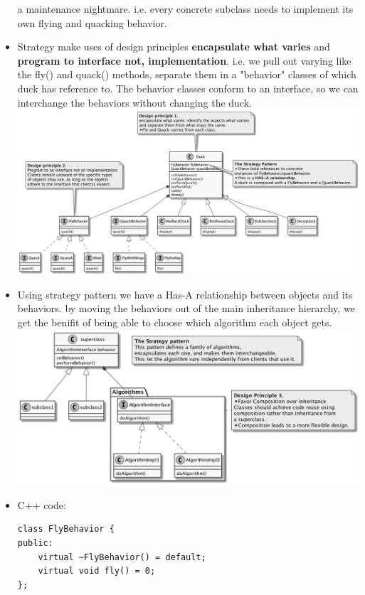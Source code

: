 \documentclass[11pt]{article}
\begin{document}
\begin{itemize}
        a maintenance nightmare. i.e. every concrete subclass needs to implement its own flying and quacking behavior.
        \item Strategy make uses of design principles \textbf{encapsulate what varies} and \textbf{program to interface not, implementation}.
        i.e. we pull out varying like the fly() and quack() methods, separate them in a "behavior" classes of which duck
        has reference to. The behavior classes conform to an interface, so we can interchange the behaviors without changing
        the duck.\\
        \includegraphics[scale=0.15]{strategy/3_duck_with_interfaces}
        \item Using strategy pattern we have a Has-A relationship between objects and its behaviors. by moving the behaviors
        out of the main inheritance hierarchy, we get the benifit of being able to choose which algorithm each object gets.\\
        \includegraphics[scale=0.15]{strategy/4_strategy_pattern}
        \item C++ code:
        \begin{multicols}{2}
            \begin{lstlisting}
class FlyBehavior {
public:
    virtual ~FlyBehavior() = default;
    virtual void fly() = 0;
};


\end{lstlisting}
\end{multicols}
\end{itemize}
\end{document}
